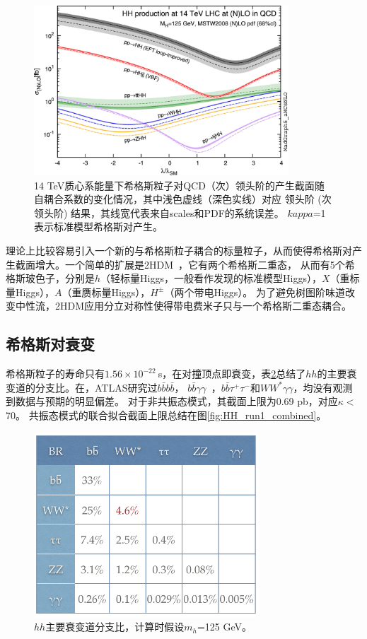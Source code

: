 \begin{figure}[h]
\centering
 \includegraphics[width=0.85\textwidth]{fig/HH_xs_kappa_14TeV.jpg}
  \caption{14 TeV质心系能量下希格斯粒子对QCD（次）领头阶的产生截面随自耦合系数的变化情况，其中浅色虚线（深色实线）对应 领头阶 (次领头阶) 结果，其线宽代表来自scales和PDF的系统误差。 
  $kappa$=1表示标准模型希格斯对产生。}
  \label{fig:HH_xs_kappa_14TeV}
\end{figure}

理论上比较容易引入一个新的与希格斯粒子耦合的标量粒子，从而使得希格斯对产生截面增大。一个简单的扩展是2HDM~\cite{2HDMTheory}，它有两个希格斯二重态，
从而有5个希格斯玻色子，分别是$h$（轻标量Higgs，一般看作发现的标准模型Higgs），$X$（重标量Higgs），$A$（重赝标量Higgs），$H^{\pm}$（两个带电Higgs）。
为了避免树图阶味道改变中性流，2HDM应用分立对称性使得带电费米子只与一个希格斯二重态耦合。

\subsection{希格斯对衰变}
希格斯粒子的寿命只有$1.56\times10^{-22}~$s，在对撞顶点即衰变，表\ref{fig:HH_br}总结了$hh$的主要衰变道的分支比。在\RunOne ，ATLAS研究过$b\bar{b}b\bar{b}$\cite{Aad:2015uka}，
$b\bar{b}\gamma\gamma$~\cite{Aad:2014yja}，$b\bar{b}\tau^{+}\tau^{-}$和$WW^{*}\gamma\gamma$，均没有观测到数据与预期的明显偏差。
对于非共振态模式，其截面上限为0.69 pb，对应$\kappa<$70。
共振态模式的联合拟合截面上限总结在图\ref{fig:HH_run1_combined}。
\begin{figure}[h]
\centering
 \includegraphics[width=0.75\textwidth]{fig/HH_br.png}
  \caption{$hh$主要衰变道分支比，计算时假设$m_h$=125 GeV。}
  \label{fig:HH_br}
\end{figure}

